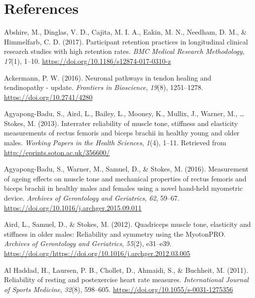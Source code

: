 \documentclass[man,floatsintext]{apa6}
\begin{document}
\clearpage

\hypertarget{references}{%
\section{References}\label{references}}

\setlength{\parindent}{-0.5in}
\setlength{\leftskip}{0.5in}

\hypertarget{refs}{}
\leavevmode\hypertarget{ref-Abshire2017}{}%
Abshire, M., Dinglas, V. D., Cajita, M. I. A., Eakin, M. N., Needham, D. M., \& Himmelfarb, C. D. (2017). Participant retention practices in longitudinal clinical research studies with high retention rates. \emph{BMC Medical Research Methodology}, \emph{17}(1), 1--10. \url{https://doi.org/10.1186/s12874-017-0310-z}

\leavevmode\hypertarget{ref-AckermannPaul2016}{}%
Ackermann, P. W. (2016). Neuronal pathways in tendon healing and tendinopathy - update. \emph{Frontiers in Bioscience}, \emph{19}(8), 1251--1278. \url{https://doi.org/10.2741/4280}

\leavevmode\hypertarget{ref-Agyapong-Badu2013}{}%
Agyapong-Badu, S., Aird, L., Bailey, L., Mooney, K., Mullix, J., Warner, M., \ldots{} Stokes, M. (2013). Interrater reliability of muscle tone, stiffness and elasticity measurements of rectus femoris and biceps brachii in healthy young and older males. \emph{Working Papers in the Health Sciences}, \emph{1}(4), 1--11. Retrieved from \url{http://eprints.soton.ac.uk/356600/}

\leavevmode\hypertarget{ref-Agyapong-Badu2016}{}%
Agyapong-Badu, S., Warner, M., Samuel, D., \& Stokes, M. (2016). Measurement of ageing effects on muscle tone and mechanical properties of rectus femoris and biceps brachii in healthy males and females using a novel hand-held myometric device. \emph{Archives of Gerontology and Geriatrics}, \emph{62}, 59--67. \url{https://doi.org/10.1016/j.archger.2015.09.011}

\leavevmode\hypertarget{ref-Aird2012}{}%
Aird, L., Samuel, D., \& Stokes, M. (2012). Quadriceps muscle tone, elasticity and stiffness in older males: Reliability and symmetry using the MyotonPRO. \emph{Archives of Gerontology and Geriatrics}, \emph{55}(2), e31--e39. \url{https://doi.org/https://doi.org/10.1016/j.archger.2012.03.005}

\leavevmode\hypertarget{ref-AlHaddad2011}{}%
Al Haddad, H., Laursen, P. B., Chollet, D., Ahmaidi, S., \& Buchheit, M. (2011). Reliability of resting and postexercise heart rate measures. \emph{International Journal of Sports Medicine}, \emph{32}(8), 598--605. \url{https://doi.org/10.1055/s-0031-1275356}
\end{document}
